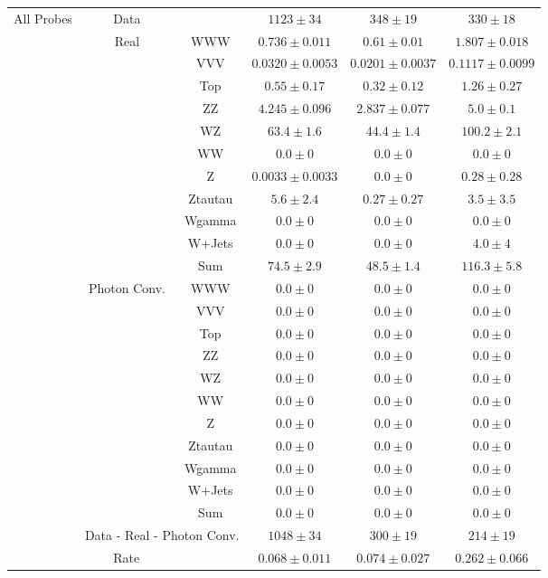 \begin{tabular}{|c|cc||c|c|c|}
\hline
\hline
\multirow{23}{*}{All Probes}&Data &   & $1123 \pm 34$ &  $348 \pm 19$ &  $330 \pm 18$\\ 
\cline{2-6}
&\multirow{11}{*}{Real}& WWW &  $0.736 \pm 0.011$ &  $0.61 \pm 0.01$ &  $1.807 \pm 0.018$\\ 
&& VVV &  $0.0320 \pm 0.0053$ &  $0.0201 \pm 0.0037$ &  $0.1117 \pm 0.0099$\\ 
&& Top &  $0.55 \pm 0.17$ &  $0.32 \pm 0.12$ &  $1.26 \pm 0.27$\\ 
&& ZZ &  $4.245 \pm 0.096$ &  $2.837 \pm 0.077$ &  $5.0 \pm 0.1$\\ 
&& WZ &  $63.4 \pm 1.6$ &  $44.4 \pm 1.4$ &  $100.2 \pm 2.1$\\ 
&& WW &  $0.0 \pm 0$ &  $0.0 \pm 0$ &  $0.0 \pm 0$\\ 
&& Z &  $0.0033 \pm 0.0033$ &  $0.0 \pm 0$ &  $0.28 \pm 0.28$\\ 
&& Ztautau &  $5.6 \pm 2.4$ &  $0.27 \pm 0.27$ &  $3.5 \pm 3.5$\\ 
&& Wgamma &  $0.0 \pm 0$ &  $0.0 \pm 0$ &  $0.0 \pm 0$\\ 
&& W+Jets &  $0.0 \pm 0$ &  $0.0 \pm 0$ &  $4.0 \pm 4$\\ 
\cline{3-6}
&& Sum &  $74.5 \pm 2.9$ &  $48.5 \pm 1.4$ &  $116.3 \pm 5.8$\\ 
\cline{2-6}
\cline{2-6}
&\multirow{11}{*}{Photon Conv.}& WWW &  $0.0 \pm 0$ &  $0.0 \pm 0$ &  $0.0 \pm 0$\\ 
&& VVV &  $0.0 \pm 0$ &  $0.0 \pm 0$ &  $0.0 \pm 0$\\ 
&& Top &  $0.0 \pm 0$ &  $0.0 \pm 0$ &  $0.0 \pm 0$\\ 
&& ZZ &  $0.0 \pm 0$ &  $0.0 \pm 0$ &  $0.0 \pm 0$\\ 
&& WZ &  $0.0 \pm 0$ &  $0.0 \pm 0$ &  $0.0 \pm 0$\\ 
&& WW &  $0.0 \pm 0$ &  $0.0 \pm 0$ &  $0.0 \pm 0$\\ 
&& Z &  $0.0 \pm 0$ &  $0.0 \pm 0$ &  $0.0 \pm 0$\\ 
&& Ztautau &  $0.0 \pm 0$ &  $0.0 \pm 0$ &  $0.0 \pm 0$\\ 
&& Wgamma &  $0.0 \pm 0$ &  $0.0 \pm 0$ &  $0.0 \pm 0$\\ 
&& W+Jets &  $0.0 \pm 0$ &  $0.0 \pm 0$ &  $0.0 \pm 0$\\ 
\cline{3-6}
&& Sum &  $0.0 \pm 0$ &  $0.0 \pm 0$ &  $0.0 \pm 0$\\ 
\cline{2-6}
\cline{2-6}
&\multicolumn{2}{|c||}{Data - Real - Photon Conv.} &  $1048 \pm 34$ &  $300 \pm 19$ &  $214 \pm 19$\\ 
\hline
\hline
\multicolumn{3}{|c||}{Rate} &  $0.068 \pm 0.011$ &  $0.074 \pm 0.027$ &  $0.262 \pm 0.066$\\ 
\hline
\end{tabular}
